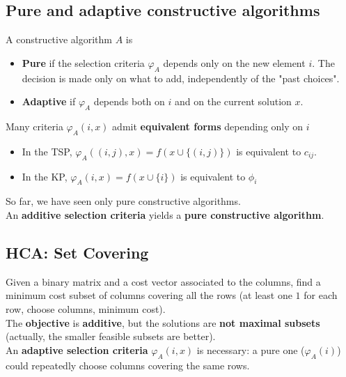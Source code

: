 \documentclass[11pt]{article}
\begin{document}
	\newpage
	
	\subsection{Pure and adaptive constructive algorithms}
	A constructive algorithm $A$ is
	\begin{itemize}
		\item \textbf{Pure} if the selection criteria $\varphi_A$ depends only on the new element $i$. The decision is made only on what to add, independently of the "past choices".\\
		
		\item \textbf{Adaptive} if $\varphi_A$ depends both on $i$ and on the current solution $x$.\\
	\end{itemize}
	
	Many criteria $\varphi_A (i, x)$ admit \textbf{equivalent forms} depending only on $i$
	\begin{itemize}
		\item In the TSP, $\varphi_A ((i, j), x) = f (x \cup \{(i, j)\})$ is equivalent to $c_{ij}$.\\
		
		\item In the KP, $\varphi_A (i, x) = f (x \cup \{i\})$ is equivalent to $\phi_i$
	\end{itemize}
	
	So far, we have seen only pure constructive algorithms.\\
	
	An \textbf{additive selection criteria} yields a \textbf{pure constructive algorithm}.\\
	
	\newpage
	
	\subsection{HCA: Set Covering}
	Given a binary matrix and a cost vector associated to the columns, find a minimum cost subset of columns covering all the rows (at least one $1$ for each row, choose columns, minimum cost).\\
	
	The \textbf{objective} is \textbf{additive}, but the solutions are \textbf{not maximal subsets} (actually, the smaller feasible subsets are better).\\
	
	An \textbf{adaptive selection criteria} $\varphi_A (i, x)$ is necessary: a pure one ($\varphi_A (i)$) could repeatedly choose columns covering the same rows.\\
	
\end{document}

